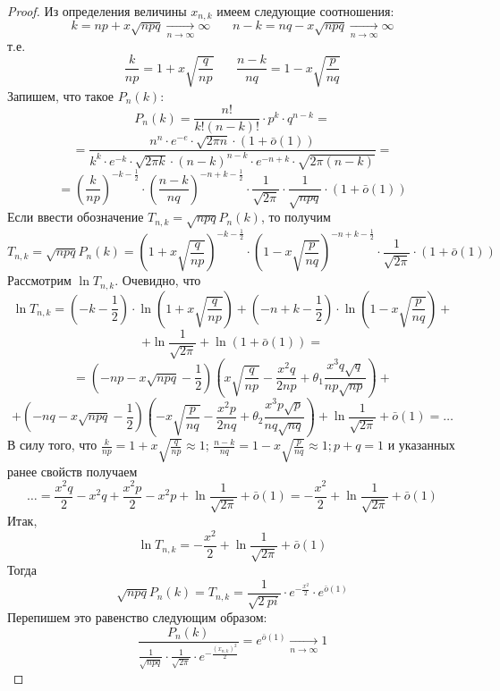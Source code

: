 \begin{theorem}
\begin{proof}
		Из определения величины $x_{n, k}$ имеем следующие соотношения:
		\[ k = np + x \sqrt{npq} \underset{n \to \infty}{\to} \infty ~~~~~~~~ n - k = nq - x\sqrt{npq} \underset{n \to \infty}{\to} \infty \]
		т.е.
		\[ \frac{k}{np} = 1 + x \sqrt{\frac{q}{np}} ~~~~~~~~ \frac{n - k}{nq} = 1 - x \sqrt{\frac{p}{nq}} \]
		Запишем, что такое $P_n(k)$:
		\[ P_n(k) = \frac{n!}{k! (n - k)!} \cdot p^k \cdot q^{n - k} = \]
		\[ = \frac{n^n \cdot e^{-e} \cdot \sqrt{2 \pi n} \cdot (1 + \bar o (1))}{k^k \cdot e^{-k} \cdot \sqrt{2 \pi k} \cdot (n - k)^{n-k} \cdot e^{-n+k} \cdot \sqrt{2 \pi (n - k)}} = \]
		\[ = \left( \frac{k}{np} \right)^{-k-\frac{1}{2}} \cdot \left( \frac{n - k}{nq} \right)^{-n + k - \frac{1}{2}} \cdot \frac{1}{\sqrt{2 \pi}} \cdot \frac{1}{\sqrt{npq}} \cdot (1 + \bar o(1)) \]
		Если ввести обозначение $T_{n, k} = \sqrt{npq} P_n (k)$, то получим
		\[ T_{n, k} = \sqrt{npq} P_n(k) = \left( 1 + x \sqrt{\frac{q}{np}} \right)^{-k - \frac{1}{2}} \cdot \left( 1 - x \sqrt{\frac{p}{nq}} \right)^{-n+k-\frac{1}{2}} \cdot \frac{1}{\sqrt{2 \pi}} \cdot (1 + \bar o (1)) \]
		Рассмотрим $\ln T_{n, k}$. Очевидно, что
		\[ \ln T_{n, k} = \left( -k - \frac{1}{2} \right) \cdot \ln \left( 1 + x \sqrt{\frac{q}{np}} \right) + \left( -n + k - \frac{1}{2} \right) \cdot \ln \left( 1 - x \sqrt{\frac{p}{nq}} \right) + \]
		\[ + \ln \frac{1}{\sqrt{2 \pi}} + \ln (1 + \bar o (1)) = \]
		\[ = \left( -np -x \sqrt{npq} - \frac{1}{2} \right) \left( x \sqrt{\frac{q}{np}} - \frac{x^2q}{2np} + \theta_1 \frac{x^3q \sqrt{q}}{np \sqrt{np}} \right) + \]
		\[ + \left( -nq -x \sqrt{npq} - \frac{1}{2} \right) \left( -x \sqrt{\frac{p}{nq}} - \frac{x^2p}{2nq} + \theta_2 \frac{x^3p \sqrt{p}}{nq \sqrt{nq}} \right) + \ln \frac{1}{\sqrt{2 \pi}} + \bar o (1) = \dots \]
		В силу того, что $\frac{k}{np} = 1 + x \sqrt{\frac{q}{np}} \approx 1$; $\frac{n-k}{nq} = 1 - x \sqrt{\frac{p}{nq}} \approx 1; p+q=1$ и указанных ранее свойств получаем
		\[ \dots = \frac{x^2 q}{2} - x^2q + \frac{x^2p}{2} - x^2p + \ln \frac{1}{\sqrt{2 \pi}} + \bar o (1) = - \frac{x^2}{2} + \ln \frac{1}{\sqrt{2 \pi}} + \bar o (1) \]
		Итак,
		\[ \ln T_{n,k} = - \frac{x^2}{2} + \ln \frac{1}{\sqrt{2 \pi}} + \bar o (1) \]
		Тогда
		\[ \sqrt{npq} P_n(k) = T_{n, k} = \frac{1}{\sqrt{2\ pi}} \cdot e^{-\frac{x^2}{2}} \cdot e^{\bar o (1)} \]
		Перепишем это равенство следующим образом:
		\[ \dfrac{P_n(k)}{\frac{1}{\sqrt{npq}} \cdot \frac{1}{\sqrt{2 \pi}} \cdot e^{- \frac{(x_{n, k})^2}{2}}} = e^{\bar o (1)} \underset{n \to \infty}{\to} 1 \]
	\end{proof}
\end{theorem}

